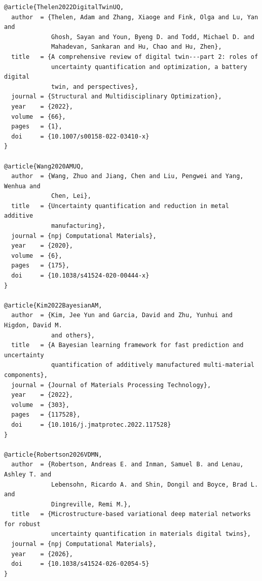 \begin{verbatim}
@article{Thelen2022DigitalTwinUQ,
  author  = {Thelen, Adam and Zhang, Xiaoge and Fink, Olga and Lu, Yan and
             Ghosh, Sayan and Youn, Byeng D. and Todd, Michael D. and
             Mahadevan, Sankaran and Hu, Chao and Hu, Zhen},
  title   = {A comprehensive review of digital twin---part 2: roles of
             uncertainty quantification and optimization, a battery digital
             twin, and perspectives},
  journal = {Structural and Multidisciplinary Optimization},
  year    = {2022},
  volume  = {66},
  pages   = {1},
  doi     = {10.1007/s00158-022-03410-x}
}

@article{Wang2020AMUQ,
  author  = {Wang, Zhuo and Jiang, Chen and Liu, Pengwei and Yang, Wenhua and
             Chen, Lei},
  title   = {Uncertainty quantification and reduction in metal additive
             manufacturing},
  journal = {npj Computational Materials},
  year    = {2020},
  volume  = {6},
  pages   = {175},
  doi     = {10.1038/s41524-020-00444-x}
}

@article{Kim2022BayesianAM,
  author  = {Kim, Jee Yun and Garcia, David and Zhu, Yunhui and Higdon, David M.
             and others},
  title   = {A Bayesian learning framework for fast prediction and uncertainty
             quantification of additively manufactured multi-material components},
  journal = {Journal of Materials Processing Technology},
  year    = {2022},
  volume  = {303},
  pages   = {117528},
  doi     = {10.1016/j.jmatprotec.2022.117528}
}

@article{Robertson2026VDMN,
  author  = {Robertson, Andreas E. and Inman, Samuel B. and Lenau, Ashley T. and
             Lebensohn, Ricardo A. and Shin, Dongil and Boyce, Brad L. and
             Dingreville, Remi M.},
  title   = {Microstructure-based variational deep material networks for robust
             uncertainty quantification in materials digital twins},
  journal = {npj Computational Materials},
  year    = {2026},
  doi     = {10.1038/s41524-026-02054-5}
}
\end{verbatim}
